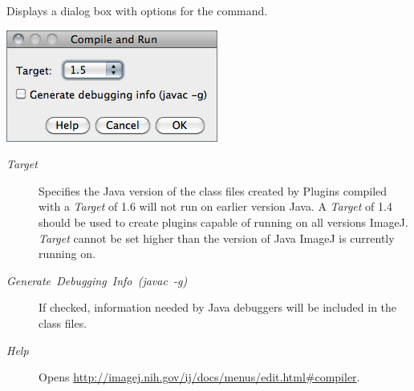 Displays a dialog box with options for the 
command.\vspace*{\bigskipamount}


\begin{minipage}[c][1\totalheight][t]{0.37\columnwidth}%
\includegraphics[scale=0.55]{images/Compiler}%
\end{minipage}%
\begin{minipage}[c][1\totalheight][t]{0.63\columnwidth}%
\begin{description}
\item [{\emph{Target}}] Specifies the Java version of the class files created
by 
Plugins compiled with a \emph{Target} of 1.6 will not run on earlier
version Java. A \emph{Target} of 1.4 should be used to create plugins
capable of running on all versions ImageJ. \emph{Target} cannot be
set higher than the version of Java ImageJ is currently running on.\end{description}
%
\end{minipage}
\begin{description}
\item [{\emph{Generate\ Debugging\ Info\ (javac\ -g)}}] If checked,
information needed by Java debuggers will be included
in the class files.
\item [{\emph{Help}}] Opens \url{http://imagej.nih.gov/ij/docs/menus/edit.html#compiler}.
\end{description}

\subsubsection[\protect\userinterface{DICOM\ldots{}}]{\protect{}\label{sub:DICOM...}}

